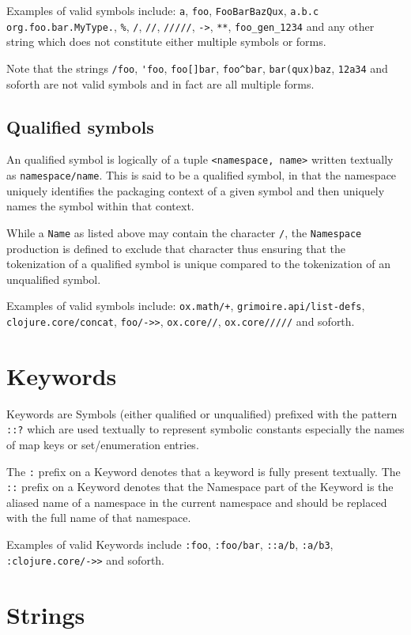 \documentclass{report}
\begin{document}
Examples of valid symbols include: \verb|a|, \verb|foo|, \verb|FooBarBazQux|,
\verb|a.b.c| \verb|org.foo.bar.MyType.|, \verb|%|, \verb|/|, \verb|//|,
\verb|/////|, \verb|->|, \verb|**|, \verb|foo_gen_1234| and any other string
which does not constitute either multiple symbols or forms.

Note that the strings \verb|/foo|, \verb|'foo|, \verb|foo[]bar|, \verb|foo^bar|,
\verb|bar(qux)baz|, \verb|12a34| and soforth are not valid symbols and in fact
are all multiple forms.

\subsection{Qualified symbols}
An qualified symbol is logically of a tuple \verb|<namespace, name>| written
textually as \verb|namespace/name|. This is said to be a qualified symbol, in
that the namespace uniquely identifies the packaging context of a given symbol
and then uniquely names the symbol within that context.

While a \verb|Name| as listed above may contain the character \verb|/|, the
\verb|Namespace| production is defined to exclude that character thus ensuring
that the tokenization of a qualified symbol is unique compared to the
tokenization of an unqualified symbol.

Examples of valid symbols include: \verb|ox.math/+|,
\verb|grimoire.api/list-defs|, \verb|clojure.core/concat|, \verb|foo/->>|,
\verb|ox.core//|, \verb|ox.core/////| and soforth.

\section{Keywords}


Keywords are Symbols (either qualified or unqualified) prefixed with the pattern
\verb|::?| which are used textually to represent symbolic constants especially
the names of map keys or set/enumeration entries.

The \verb|:| prefix on a Keyword denotes that a keyword is fully present
textually. The \verb|::| prefix on a Keyword denotes that the Namespace part of
the Keyword is the aliased name of a namespace in the current namespace and
should be replaced with the full name of that namespace.

Examples of valid Keywords include \verb|:foo|, \verb|:foo/bar|, \verb|::a/b|,
\verb|:a/b3|, \verb|:clojure.core/->>| and soforth.

\section{Strings}

\end{document}
